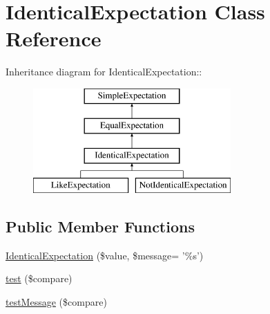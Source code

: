 \hypertarget{class_identical_expectation}{
\section{IdenticalExpectation Class Reference}
\label{class_identical_expectation}
}
Inheritance diagram for IdenticalExpectation::\begin{figure}[H]
\begin{center}
\leavevmode
\includegraphics[height=4cm]{class_identical_expectation}
\end{center}
\end{figure}
\subsection*{Public Member Functions}
\begin{DoxyCompactItemize}
\item 
\hyperlink{class_identical_expectation_afe432a076cb2c4c1eaaeaab22bb6c63f}{IdenticalExpectation} (\$value, \$message= '\%s')
\item 
\hyperlink{class_identical_expectation_a6076cd232c16294ca0a7979ce11e57da}{test} (\$compare)
\item 
\hyperlink{class_identical_expectation_a80c36b4efb3126695a69d4823ab3122b}{testMessage} (\$compare)
\end{DoxyCompactItemize}


